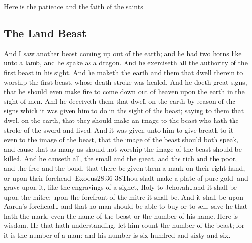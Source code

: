 \noindent
Here is the patience and the faith of the saints.
\subsection*{The Land Beast}
And I saw another beast coming up out of the earth; and he had two horns%
like unto a lamb, and he spake as a dragon. 
And he exerciseth all the authority of the first beast in his sight. And he maketh the earth and them that dwell therein to worship the first beast, whose death-stroke was healed. 
And he doeth great signs, that he should even make fire to come down out of heaven upon the earth in the sight of men.%
And he deceiveth them that dwell on the earth by reason of the signs which it was given him to do in the sight of the beast; saying to them that dwell on the earth, that they should make an image to the beast who hath the stroke of the sword and lived. 
And it was given unto him to give breath to it, even to the image of the beast, that the image of the beast should both speak, and cause that as many as should not worship the image of the beast should be killed.%
And he causeth all, the small and the great, and the rich and the poor, and the free and the bond, that there be given them a mark on their right hand, or upon their forehead;%
				  {Exodus}{28:36-38}{Thou shalt make a plate of pure gold, and grave upon it, like the engravings of a signet, Holy to Jehovah\ldots and it shall be upon the mitre; upon the forefront of the mitre it shall be. And it shall be upon Aaron’s forehead\ldots} %
and that no man should be able to buy or to sell, save he that hath the mark, even the name of the beast or the number of his name. 
Here is wisdom. He that hath understanding, let him count the number of the beast; for it is the number of a man: and his number is six hundred and sixty and six.
